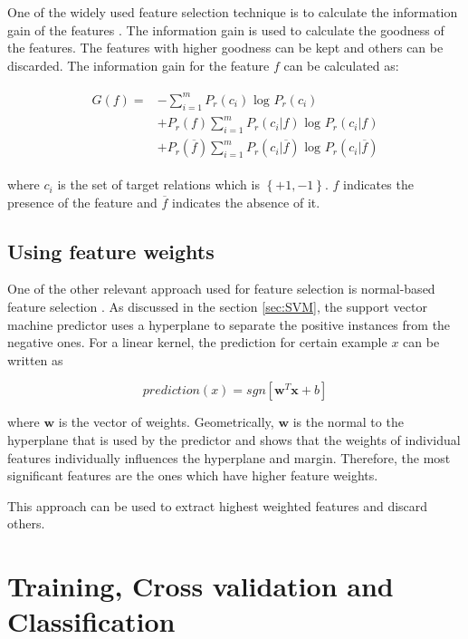 One of the widely used feature selection technique is to calculate the information gain of the features \cite{yang1997comparative}. The information gain is used to calculate the goodness of the features. The features with higher goodness can be kept and others can be discarded. The information gain for the feature $f$ can be calculated as:

\begin{align}
\begin{aligned}
 G \left( f \right) = & -  \sum^m_{i=1} P_r(c_i) \text{ log } P_r(c_i) \\ 
  & + P_r(f) \sum^m_{i=1} P_r(c_i|f) \text{ log } P_r(c_i|f)\\ 
  & +  P_r(\overline{f}) \sum^m_{i=1} P_r(c_i|\overline{f}) \text{ log } P_r(c_i|\overline{f})  
\end{aligned}  
\end{align}

where $c_i$ is the set of target relations which is $\left\lbrace +1, -1 \right\rbrace$. $f$ indicates the presence of the feature and $\overline{f}$ indicates the absence of it.

\subsection{Using feature weights}\label{subsec:FWR}

One of the other relevant approach used for feature selection is normal-based feature selection \cite{brank2002feature}. As discussed in the section \ref{sec:SVM}, the support vector machine predictor uses a hyperplane to separate the positive instances from the negative ones. For a linear kernel, the prediction for certain example $x$ can be written as 

$$
prediction(x) = sgn \left[ \mathbf{w}^T\mathbf{x} + b \right]
$$

where $\mathbf{w}$ is the vector of weights. Geometrically, $\mathbf{w}$ is the normal to the hyperplane that is used by the predictor and \cite{brank2002feature} shows that the weights of individual features individually influences the hyperplane and margin. Therefore, the most significant features are the ones which have higher feature weights.

This approach can be used to extract highest weighted features and discard others.


\section{Training, Cross validation and Classification}\label{sec:training}

